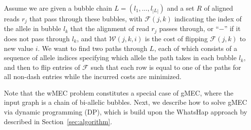 \begin{problem}\label{prob:gMEC}
Assume we are given a bubble chain $L=(l_1,\ldots,l_{|L|})$ and a set $R$ of aligned reads $r_j$ that pass through these bubbles, with $\mathcal{F}(j,k)$ indicating the index of the allele in bubble $l_k$ that the alignment of read $r_j$ passes through, or ``$-$'' if it does not pass through $l_k$, and that $\mathcal{W}(j,k,i)$ is the cost of flipping $\mathcal{F}(j,k)$ to new value $i$.  
We want to find two paths through $L$, each of which consists of a sequence of allele indices specifying which allele the path takes in each bubble $l_k$, and then to flip entries of $\mathcal{F}$ such that each row is equal to one of the paths for all non-dash entries while the incurred costs are minimized.
\end{problem}
Note that the wMEC problem constitutes a special case of gMEC, where the input graph is a chain of bi-allelic bubbles.
Next, we describe how to solve gMEC via dynamic programming (DP), which is build upon the WhatsHap approach by \cite{Patterson2015} described in Section~\ref{sec:algorithm}.

% 

